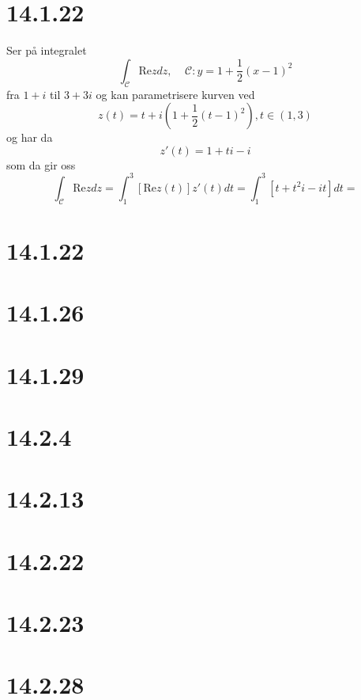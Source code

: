 \documentclass{report}
\newcommand{\nbrack}[1]{\left( #1 \right)}
\newcommand{\bbrack}[1]{\left[ #1 \right]}
\newcommand{\re}{\text{Re}}
\begin{document}
\section*{14.1.22}
Ser på integralet
\begin{equation}
  \label{eq:7}
  \int_{\mathcal{C}} \re z dz, \;\;\;\; \mathcal{C} : y = 1 + \frac{1}{2}(x-1)^{2}
\end{equation}
fra $1+i$ til $3+3i$ og kan parametrisere kurven ved
\begin{equation}
  \label{eq:8}
  z(t) = t + i\nbrack{ 1 + \frac{1}{2}(t-1)^{2} }, t \in (1, 3)
\end{equation}
og har da
\begin{equation}
  \label{eq:9}
  z'(t) = 1 + ti - i
\end{equation}
som da gir oss
\begin{equation}
  \label{eq:10}
  \int_{\mathcal{C}} \re z dz = \int_{1}^{3} \bbrack{ \re z(t) } z'(t) dt = \int_{1}^{3} \bbrack{ t + t^{2}i - it } dt =
\end{equation}



\section*{14.1.22}
\section*{14.1.26}
\section*{14.1.29}
\section*{14.2.4}
\section*{14.2.13}
\section*{14.2.22}
\section*{14.2.23}
\section*{14.2.28}
\end{document}
